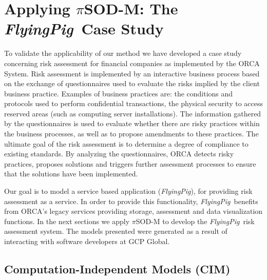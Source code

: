 \documentclass{singlecol-new}
\theoremstyle{TH}{
\newtheorem{lemma}{Lemma}
\newtheorem{theorem}[lemma]{Theorem}
\newtheorem{corrolary}[lemma]{Corrolary}
\newtheorem{conjecture}[lemma]{Conjecture}
\newtheorem{proposition}[lemma]{Proposition}
\newtheorem{claim}[lemma]{Claim}
\newtheorem{stheorem}[lemma]{Wrong Theorem}
\newtheorem{algorithm}{Algorithm}
}
\theoremstyle{THrm}{
\newtheorem{definition}{Definition}[section]
\newtheorem{question}{Question}[section]
\newtheorem{remark}{Remark}
\newtheorem{scheme}{Scheme}
}
\theoremstyle{THhit}{
\newtheorem{case}{Case}[section]
}
\theoremstyle{THhsl}{
\newtheorem{example}{Example}
}
\newcommand{\pisodm}[0]{$\pi$SOD-M\xspace}
\def\FlyingPig{\textsl{FlyingPig}\xspace}
\begin{document}
\section{Applying \pisodm: The \FlyingPig\ Case Study}
\label{sec:flyingPig}


To validate the applicability of our method we have developed a case study concerning risk assessment for financial companies as implemented by the ORCA System\footnotemark {}.%
Risk assessment is implemented by an interactive business process based on the exchange of questionnaires used to evaluate the risks implied by the client business practice.
Examples of business practices are: the conditions and protocols used to perform confidential transactions, the physical security to access reserved areas (such as computing server installations).
The information gathered by the questionnaires is used to evaluate whether there are risky practices within the business processes, as well as to propose amendments to these practices.
The ultimate goal of the risk assessment is to determine a degree of compliance to existing standards.
By analyzing the questionnaires, ORCA detects risky practices, proposes solutions and triggers further assessment processes to ensure that the solutions have been implemented.

Our goal is to model a service based application (\FlyingPig), for providing risk assessment as a service.
In order to provide this functionality, \FlyingPig\ benefits from ORCA's legacy services providing storage, assessment and data visualization functions.
%
In the next sections we apply \pisodm to develop the \FlyingPig\ risk assessment system.
The models presented were generated as a result of interacting with software developers at GCP Global.



\subsection{Computation-Independent Models (CIM)}
\end{document}
